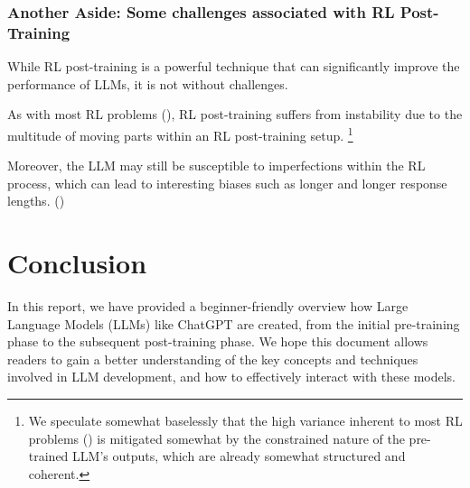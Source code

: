 \documentclass{article} %
\begin{document}
\subsubsection{Another Aside: Some challenges associated with RL Post-Training}
While RL post-training is a powerful technique that can significantly improve the performance of LLMs,
it is not without challenges.

As with most RL problems (\cite{Jones-2021}), RL post-training suffers from instability due to
the multitude of moving parts within an RL post-training setup.
\footnote{
    We speculate somewhat baselessly that the high variance inherent to most RL problems 
    (\cite{Bjorck-et-al-2022, Irpan-2018})
    is mitigated somewhat by the constrained nature of the pre-trained LLM's outputs,
    which are already somewhat structured and coherent.
}

Moreover, the LLM may still be susceptible to imperfections within the RL process,
which can lead to interesting biases such as longer and longer response lengths.
(\cite{Liu-et-al-2025})

\section{Conclusion}
In this report, we have provided a beginner-friendly overview how Large Language Models (LLMs) like ChatGPT are created,
from the initial pre-training phase to the subsequent post-training phase.
We hope this document allows readers to gain a better understanding of the key concepts and techniques involved in LLM development,
and how to effectively interact with these models.




\appendix
\end{document}
